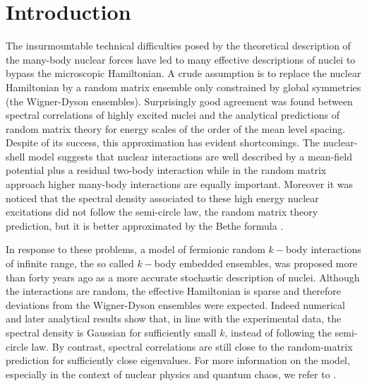 \documentclass[aps,showpacs,floatfix,superscriptaddress,pre,11pt]{revtex4-1}
\begin{document}
\section{Introduction}
The insurmountable technical difficulties posed by the theoretical description of the many-body nuclear forces have led to many effective descriptions of  nuclei to %
bypass the microscopic Hamiltonian.
A crude assumption is to replace the nuclear Hamiltonian by
a random matrix ensemble \cite{wigner1951,dyson1962a,dyson1962b,dyson1962c,dyson1962d,dyson1972,guhr1998} only constrained by global symmetries (the Wigner-Dyson ensembles). Surprisingly good agreement was found between spectral correlations of highly excited nuclei and the analytical predictions of random matrix theory for energy scales of the order of the mean level spacing.
Despite of its success, %
this approximation has evident shortcomings. The nuclear-shell model suggests that nuclear interactions are well described by a mean-field potential plus a residual two-body interaction while in the random matrix approach higher many-body interactions are equally important. Moreover it was noticed that the spectral density associated to these high energy nuclear excitations did not follow the semi-circle law, the random matrix theory prediction, but it is better approximated by the Bethe formula \cite{bethe1936}. %

In  response to these problems, a model of fermionic random $k-$body interactions of infinite range, the so called $k-$body embedded ensembles, was proposed more than forty years ago \cite{bohigas1971,bohigas1971a,french1970,french1971} as a more accurate stochastic description of nuclei. 
Although the interactions are random, %
the effective Hamiltonian is sparse and therefore deviations from the Wigner-Dyson ensembles were expected.
Indeed numerical \cite{bohigas1971a} and later analytical results \cite{mon1975} show that, in line with the experimental data, the spectral density is Gaussian for sufficiently small $k$, instead of following the semi-circle law. By contrast, spectral correlations are still close to the random-matrix prediction \cite{verbaarschot1984} for sufficiently close eigenvalues. For more information on the model, especially in the context of nuclear physics and quantum chaos, we refer to \cite{benet2003,gomez2011,brody1981,kota2014,kota2011a}.
\end{document}
